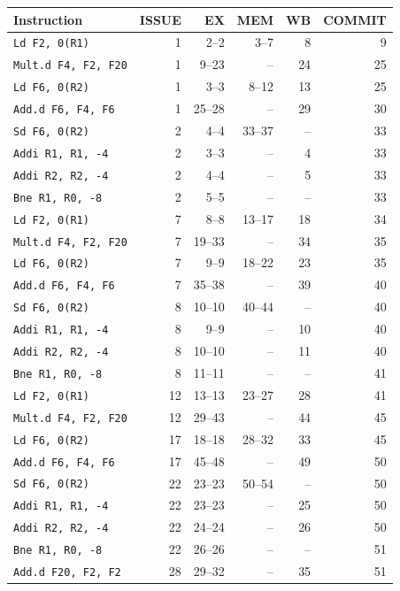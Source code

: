 \begin{tabular}{@{}lrrrrr@{}}\toprule
Instruction & ISSUE & EX & MEM & WB & COMMIT\\\midrule
\texttt{Ld F2, 0(R1)} & 1 & 2--2 & 3--7 & 8 & 9 \\
\texttt{Mult.d F4, F2, F20} & 1 & 9--23 & -- & 24 & 25 \\
\texttt{Ld F6, 0(R2)} & 1 & 3--3 & 8--12 & 13 & 25 \\
\texttt{Add.d F6, F4, F6} & 1 & 25--28 & -- & 29 & 30 \\
\texttt{Sd F6, 0(R2)} & 2 & 4--4 & 33--37 & -- & 33 \\
\texttt{Addi R1, R1, -4} & 2 & 3--3 & -- & 4 & 33 \\
\texttt{Addi R2, R2, -4} & 2 & 4--4 & -- & 5 & 33 \\
\texttt{Bne R1, R0, -8} & 2 & 5--5 & -- & -- & 33 \\
\texttt{Ld F2, 0(R1)} & 7 & 8--8 & 13--17 & 18 & 34 \\
\texttt{Mult.d F4, F2, F20} & 7 & 19--33 & -- & 34 & 35 \\
\texttt{Ld F6, 0(R2)} & 7 & 9--9 & 18--22 & 23 & 35 \\
\texttt{Add.d F6, F4, F6} & 7 & 35--38 & -- & 39 & 40 \\
\texttt{Sd F6, 0(R2)} & 8 & 10--10 & 40--44 & -- & 40 \\
\texttt{Addi R1, R1, -4} & 8 & 9--9 & -- & 10 & 40 \\
\texttt{Addi R2, R2, -4} & 8 & 10--10 & -- & 11 & 40 \\
\texttt{Bne R1, R0, -8} & 8 & 11--11 & -- & -- & 41 \\
\texttt{Ld F2, 0(R1)} & 12 & 13--13 & 23--27 & 28 & 41 \\
\texttt{Mult.d F4, F2, F20} & 12 & 29--43 & -- & 44 & 45 \\
\texttt{Ld F6, 0(R2)} & 17 & 18--18 & 28--32 & 33 & 45 \\
\texttt{Add.d F6, F4, F6} & 17 & 45--48 & -- & 49 & 50 \\
\texttt{Sd F6, 0(R2)} & 22 & 23--23 & 50--54 & -- & 50 \\
\texttt{Addi R1, R1, -4} & 22 & 23--23 & -- & 25 & 50 \\
\texttt{Addi R2, R2, -4} & 22 & 24--24 & -- & 26 & 50 \\
\texttt{Bne R1, R0, -8} & 22 & 26--26 & -- & -- & 51 \\
\texttt{Add.d F20, F2, F2} & 28 & 29--32 & -- & 35 & 51 \\
\bottomrule\end{tabular}